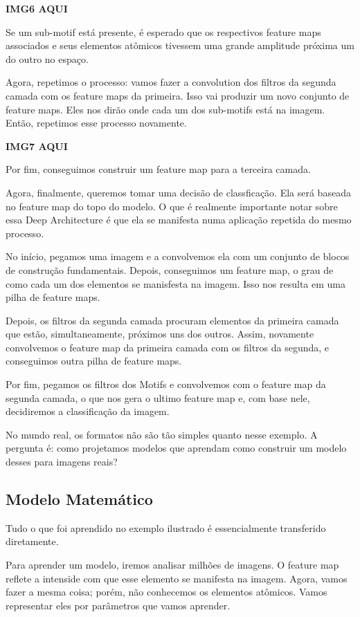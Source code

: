 \documentclass[11pt, a4paper]{article}
\begin{document}
\textbf{IMG6 AQUI}

Se um sub-motif está presente, é esperado que os respectivos feature maps associados e seus elementos atômicos tivessem uma grande amplitude próxima um do outro no espaço.

Agora, repetimos o processo: vamos fazer a convolution dos filtros da segunda camada com os feature maps da primeira. Isso vai produzir um novo conjunto de feature maps. Eles nos dirão onde cada um dos sub-motifs está na imagem. Então, repetimos esse processo novamente.

\textbf{IMG7 AQUI}

Por fim, conseguimos construir um feature map para a terceira camada.

Agora, finalmente, queremos tomar uma decisão de classficação. Ela será baseada no feature map do topo do modelo. O que é realmente importante notar sobre essa Deep Architecture é que ela se manifesta numa aplicação repetida do mesmo processo.

No início, pegamos uma imagem e a convolvemos ela com um conjunto de blocos de construção fundamentais. Depois, conseguimos um feature map, o grau de como cada um dos elementos se manisfesta na imagem. Isso nos resulta em uma pilha de feature maps.

Depois, os filtros da segunda camada procuram elementos da primeira camada que estão, simultaneamente, próximos uns dos outros. Assim, novamente convolvemos o feature map da primeira camada com os filtros da segunda, e conseguimos outra pilha de feature maps.

Por fim, pegamos os filtros dos Motifs e convolvemos com o feature map da segunda camada, o que nos gera o ultimo feature map e, com base nele, decidiremos a classificação da imagem.

No mundo real, os formatos não são tão simples quanto nesse exemplo. A pergunta é: como projetamos modelos que aprendam como construir um modelo desses para imagens reais?

\subsection{Modelo Matemático}

Tudo o que foi aprendido no exemplo ilustrado é essencialmente transferido diretamente.

Para aprender um modelo, iremos analisar milhões de imagens. O feature map reflete a intenside com que esse elemento se manifesta na imagem. Agora, vamos fazer a mesma coisa; porém, não conhecemos os elementos atômicos. Vamos representar eles por parâmetros que vamos aprender.
\end{document}
